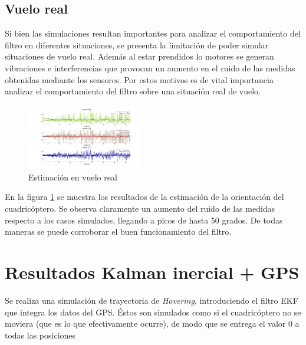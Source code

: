 \documentclass[main]{subfiles}
\begin{document}
\subsection{Vuelo real}

Si bien las simulaciones resultan importantes para analizar el comportamiento del filtro en diferentes situaciones, se presenta la limitación de poder simular situaciones de vuelo real. Además al estar prendidos lo motores se generan vibraciones e interferencias que provocan un aumento en el ruido de las medidas obtenidas mediante los sensores. Por estos motivos es de vital importancia analizar el comportamiento del filtro sobre una situación real de vuelo.\\

\begin{figure}
	\begin{center}	
	\vspace{-20pt}
	\includegraphics[width=0.45\textwidth]
		{./pics_kalman/andando.pdf}
	\end{center}
	\caption{Estimación en vuelo real}
	\label{fig:andando}
\end{figure}

En la figura \ref{fig:andando} se muestra los resultados de la estimación de la orientación del cuadricóptero. Se observa claramente un aumento del ruido de las medidas respecto a los casos simulados, llegando a picos de hasta 50 grados. De todas maneras se puede corroborar el buen funcionamiento del filtro.\\

\section{Resultados Kalman inercial + GPS}

Se realiza una simulación de trayectoria de \emph{Hovering}, introduciendo el filtro EKF que integra los datos del GPS. Éstos son simulados como si el cuadricóptero no se moviera (que es lo que efectivamente ocurre), de modo que se entrega el valor 0 a todas las posiciones
\end{document}
